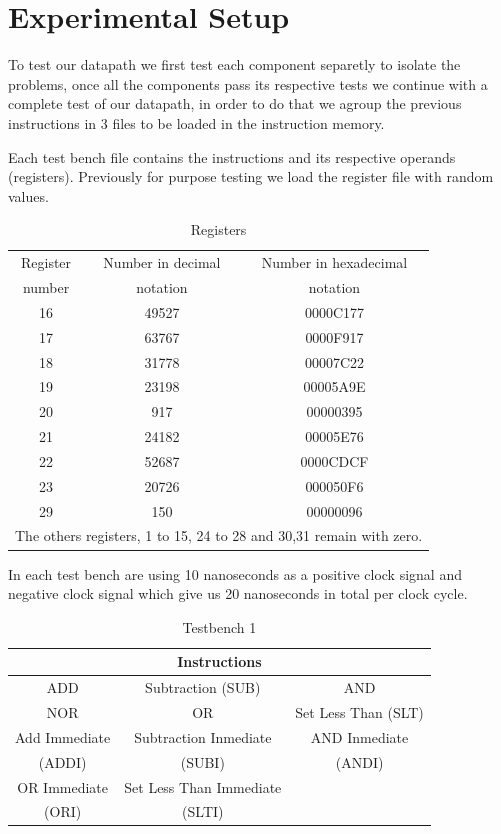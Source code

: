 \documentclass[conference]{IEEEtran}
\begin{document}
\section{Experimental Setup} %
To test our datapath we first test each component separetly to isolate the
problems, once all the components pass its respective tests we continue with a complete 
test of our datapath, in order to do that we agroup the previous instructions
in 3 files to be loaded in the instruction memory.

Each test bench file contains the instructions and its respective
operands (registers). Previously for purpose testing we load the 
register file with random values.

\begin{table}[htbp]
\caption{Registers} %
\begin{center}
\begin{tabular}{|c|c|c|}
\hline
Register&Number in decimal&Number in hexadecimal\\
number&notation&notation\\
\hline
16&49527&0000C177\\
\hline
17&63767&0000F917\\
\hline
18&31778&00007C22\\
\hline
19&23198&00005A9E\\
\hline
20&917&00000395\\
\hline
21&24182&00005E76\\
\hline
22&52687&0000CDCF\\
\hline
23&20726&000050F6\\
\hline
29&150&00000096\\
\hline
\multicolumn{3}{l}{The others registers, 1 to 15, 24 to 28 and 30,31 remain with zero.}
\end{tabular}
\label{tab_regfile}
\end{center}
\end{table}

In each test bench are using 10 nanoseconds as a positive clock signal and negative
clock signal which give us 20 nanoseconds in total per clock cycle.

\begin{table}[htbp]
\caption{Testbench 1} %
\begin{tabular}{|c|c|c|}
\hline
\multicolumn{3}{|c|}{\textbf{Instructions}} \\
\hline
ADD&Subtraction (SUB)&AND  \\
\hline
NOR&OR&Set Less Than (SLT) \\
\hline
Add Immediate&Subtraction Inmediate & AND Inmediate \\
(ADDI) &(SUBI) & (ANDI) \\
\hline
OR Immediate&Set Less Than Immediate&  \\
(ORI)&(SLTI)&  \\
\hline
\end{tabular}
\label{tab_test1}
\end{table}
\end{document}
